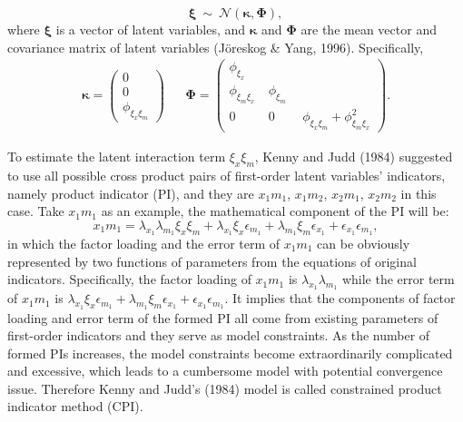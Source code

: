 \documentclass[
  man]{apa6}
\begin{document}
\begin{equation}
\boldsymbol{\xi} \ \sim \ \mathcal{N}(\boldsymbol{\kappa}, \boldsymbol{\Phi}), 
\end{equation}
where \(\boldsymbol{\xi}\) is a vector of latent variables, and \(\boldsymbol{\kappa}\) and \(\boldsymbol{\Phi}\) are the mean vector and covariance matrix of latent variables (Jöreskog \& Yang, 1996). Specifically,
\begin{align}
  \boldsymbol{\kappa} = 
  \begin{pmatrix}
    0 \\
    0 \\
    \phi_{\xi_{x}\xi_{m}}
  \end{pmatrix} &&
  \boldsymbol{\Phi} = 
  \begin{pmatrix}
    \phi_{\xi_{x}} & \ & \ \\
    \phi_{\xi_{m}\xi_{x}} & \ \phi_{\xi_{m}} \ \\
    0 & \ 0 & \ \phi_{\xi_{x}\xi_{m}} + \phi_{\xi_{m}\xi_{x}}^2
  \end{pmatrix}.
\end{align}

To estimate the latent interaction term \(\xi_{x}\xi_{m}\), Kenny and Judd (1984) suggested to use all possible cross product pairs of first-order latent variables' indicators, namely product indicator (PI), and they are \(x_{1}m_{1}\), \(x_{1}m_{2}\), \(x_{2}m_{1}\), \(x_{2}m_{2}\) in this case. Take \(x_{1}m_{1}\) as an example, the mathematical component of the PI will be:
\begin{equation}
x_{1}m_{1} = \lambda_{x_{1}}\lambda_{m_{1}}\xi_{x}\xi_{m} + \lambda_{x_{1}}\xi_{x}\epsilon_{m_{1}} + \lambda_{m_{1}}\xi_{m}\epsilon_{x_{1}} + \epsilon_{x_{1}}\epsilon_{m_{1}},
\end{equation}
in which the factor loading and the error term of \(x_{1}m_{1}\) can be obviously represented by two functions of parameters from the equations of original indicators. Specifically, the factor loading of \(x_{1}m_{1}\) is \(\lambda_{x_{1}}\lambda_{m_{1}}\) while the error term of \(x_{1}m_{1}\) is \(\lambda_{x_{1}}\xi_{x}\epsilon_{m_{1}} + \lambda_{m_{1}}\xi_{m}\epsilon_{x_{1}} + \epsilon_{x_{1}}\epsilon_{m_{1}}\). It implies that the components of factor loading and error term of the formed PI all come from existing parameters of first-order indicators and they serve as model constraints. As the number of formed PIs increases, the model constraints become extraordinarily complicated and excessive, which leads to a cumbersome model with potential convergence issue. Therefore Kenny and Judd's (1984) model is called constrained product indicator method (CPI).
\end{document}

